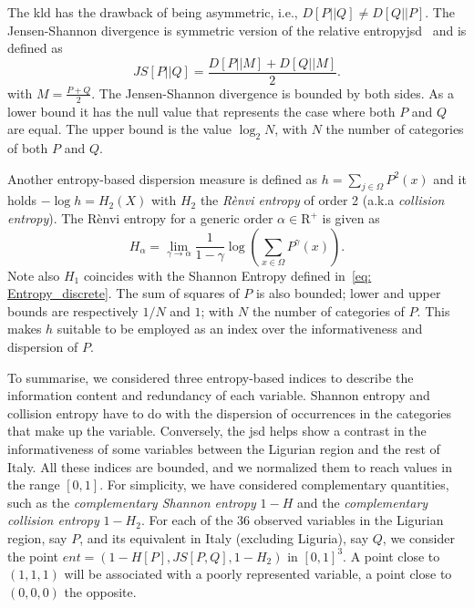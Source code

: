 The \gls{kld} has the drawback of being asymmetric, i.e., $D[P || Q] \neq D[Q || P]$.
The Jensen-Shannon divergence is symmetric version of the relative entropy\gls{jsd}~\cite[]{nielsen2021variational} and is defined as 
\begin{equation}\label{eq: JS_divergence}
    JS[P||Q] = \frac{D[P||M]+D[Q||M]}{2}. 
\end{equation} 
with $M = \displaystyle \frac{P+Q}{2}$.
The Jensen-Shannon divergence is bounded by both sides. 
As a lower bound it has the null value that represents the case where both $P$ and $Q$ are equal.
The upper bound is the value $\log_{2}{N}$, with $N$ the number of categories of both $P$ and $Q$.

Another entropy-based dispersion measure is defined as $h = \sum_{j \in \Omega} P^{2}(x) $ and it holds $-\log{h} = H_{2}(X)$ with $H_{2}$ the \emph{R\`envi entropy} of order 2 (a.k.a \emph{collision entropy}). 
The R\`envi entropy \cite[]{renyi1961measures} for a generic order $\alpha \in \mathrm{R}^{+}$ is given as
\begin{equation}\label{eq: Renvi_Entropy}
    H_{\alpha} = \lim_{\gamma \to \alpha} \frac{1}{1-\gamma}\log{\left(\sum_{x\in\Omega} P^{\gamma}(x)\right)}.
\end{equation}
Note also $H_{1}$ coincides with the Shannon Entropy defined in~\eqref{eq: Entropy_discrete}.
The sum of squares of $P$ is also bounded; lower and upper bounds are respectively $1/N$ and $1$; with $N$ the number of categories of $P$.
This makes $h$ suitable to be employed as an index over the informativeness and dispersion of $P$. 

To summarise, we considered three entropy-based indices to describe the information content and redundancy of each variable.
Shannon entropy and collision entropy have to do with the dispersion of occurrences in the categories that make up the variable.
Conversely, the \gls{jsd} helps show a contrast in the informativeness of some variables between the Ligurian region and the rest of Italy.
All these indices are bounded, and we normalized them to reach values in the range $[0, 1]$.
For simplicity, we have considered complementary quantities, such as the \emph{complementary Shannon entropy} $1-H$ and the \emph{complementary collision entropy} $1-H_{2}.$ 
For each of the 36 observed variables in the Ligurian region, say $P$, and its equivalent in Italy (excluding Liguria), say $Q$, we consider the point $ent=(1-H[P], JS[P, Q], 1-H_2 )$ in $[0,1]^3$. 
A point close to $(1, 1, 1)$ will be associated with a poorly represented variable, a point close to $(0, 0, 0)$ the opposite.

